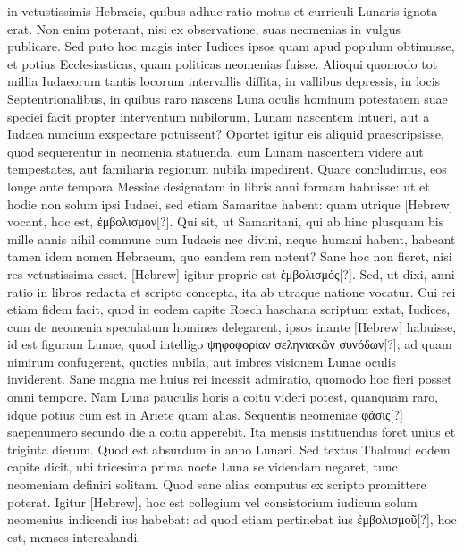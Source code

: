 in vetustissimis Hebraeis, quibus adhuc ratio motus et curriculi Lunaris
ignota erat.
Non enim poterant, nisi ex observatione, suas neomenias
in vulgus publicare.
Sed puto hoc magis inter Iudices ipsos
quam apud populum obtinuisse, et potius Ecclesiasticas, quam politicas
neomenias fuisse.
Alioqui quomodo tot millia Iudaeorum tantis
locorum intervallis diffita, in vallibus depressis, in locis Septentrionalibus,
in quibus raro nascens Luna oculis hominum potestatem
suae speciei facit propter interventum nubilorum, Lunam nascentem
intueri, aut a Iudaea nuncium exspectare potuissent?
Oportet igitur
eis aliquid praescripsisse, quod sequerentur in neomenia statuenda,
cum Lunam nascentem videre aut tempestates, aut familiaria regionum
nubila impedirent.
Quare concludimus, eos longe ante tempora
Messiae designatam in libris anni formam habuisse: ut et hodie non
solum ipsi Iudaei, sed etiam Samaritae habent:
 quam utrique \texthebrew{}[Hebrew] vocant,
hoc est, \textgreek{ἐμβολισμόν[?]}.
Qui sit, ut Samaritani, qui ab hinc plusquam
bis mille annis nihil commune cum Iudaeis nec divini, neque humani
habent, habeant tamen idem nomen Hebraeum, quo eandem rem
notent?
Sane hoc non fieret, nisi res vetustissima esset.
\texthebrew{}[Hebrew] igitur proprie
est \textgreek{ἐμβολισμός[?]}.
Sed, ut dixi, anni ratio in libros redacta et scripto
concepta, ita ab utraque natione vocatur.
Cui rei etiam fidem facit,
quod in eodem capite Rosch haschana scriptum extat, Iudices, cum
de neomenia speculatum homines delegarent,
 ipsos inante \texthebrew{}[Hebrew]
habuisse, id est figuram Lunae, quod intelligo
 \textgreek{ψηφοφορίαν σεληνιακῶν
συνόδων[?]};
ad quam nimirum confugerent, quoties nubila, aut imbres
visionem Lunae oculis inviderent.
Sane magna me huius rei incessit
admiratio, quomodo hoc fieri posset omni tempore.
Nam Luna
pauculis horis a coitu videri potest, quanquam raro, idque potius cum
est in Ariete quam alias.
Sequentis neomeniae \textgreek{φάσις[?]} saepenumero secundo
die a coitu apperebit.
Ita mensis instituendus foret unius et
triginta dierum.
Quod est absurdum in anno Lunari.
Sed textus Thalmud
eodem capite dicit, ubi tricesima prima nocte Luna se videndam
negaret, tunc neomeniam definiri solitam.
Quod sane alias computus
ex scripto promittere poterat.
Igitur \texthebrew{}[Hebrew], hoc est collegium vel
consistorium iudicum solum neomenius indicendi ius habebat: ad
quod etiam pertinebat ius \textgreek{ἐμβολισμοῦ[?]},
 hoc est, menses intercalandi.
